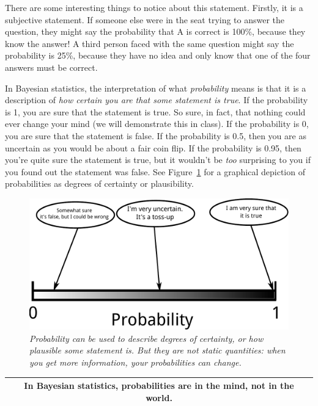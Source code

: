 There are some interesting
things to notice about this statement. Firstly, it is a subjective statement.
If someone else were in the seat trying to answer the question, they might say
the probability that A is correct is 100\%, because they know the answer!
A third person faced with the same question might say the probability is 25\%,
because they have no idea and only know that one of the four answers
must be correct.

In Bayesian statistics, the interpretation of what {\it probability} means is
that it is a description of {\it how certain you are that some statement is
true}.
If the probability is 1, you are sure that the statement is true. So sure, in
fact, that nothing could ever change your mind (we will demonstrate this in class).
If the probability is 0, you
are sure that the statement is false. If the probability is 0.5, then you
are as uncertain as you would be about a fair coin flip. If the probability is
0.95, then you're quite sure the statement is true, but it wouldn't be {\it too}
surprising to you if you found out the statement was false. See
Figure~\ref{fig:probability_scale} for a graphical depiction of probabilities
as degrees of certainty or plausibility.

\begin{figure}
\begin{center}
\includegraphics[scale=0.6]{Figures/probability_scale.pdf}
\caption{\it Probability can be used to describe degrees of certainty, or
how plausible some statement is. But they are not static quantities: when
you get more information, your probabilities can change.
\label{fig:probability_scale}}
\end{center}
\end{figure}

\begin{center}
\begin{tabular}{|c|}
\hline
{\bf In Bayesian statistics, probabilities are in the mind, not in the world.}\\
\hline
\end{tabular}
\end{center}

